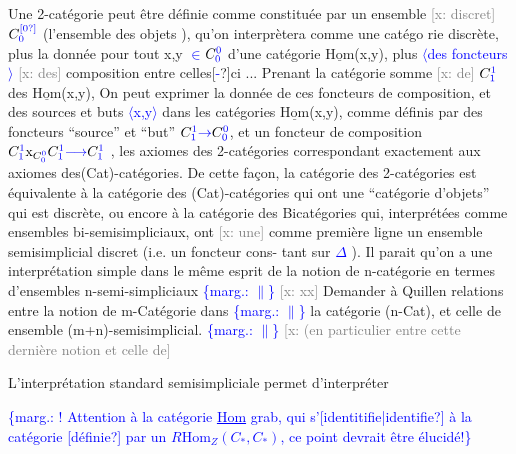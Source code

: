 \documentclass[11pt]{article}
\newcommand{\scanpage}[1]{\par\bigskip\noindent{\small\sffamily[scan #1]}\par}
\newcommand{\mspage}[1]{{\small\sffamily[p.\,#1]}}
\newcommand{\hand}[1]{\textcolor{blue}{#1}}
\newcommand{\inserted}[2][]{\textcolor{blue}{$\langle$#2$\rangle$}}
\newcommand{\margin}[1]{\textcolor{blue}{\{\textsf{marg.:} #1\}}}
\newcommand{\xout}[1]{\textcolor{gray}{[\textsf{x:} #1]}}
\newcommand{\uline}[1]{\underline{#1}}
\newcommand{\unsure}[1]{[#1?]}
\begin{document}
Une 2-catégorie peut être définie comme constituée par un ensemble
\xout{discret} $C^{\hand{\unsure{0}}}_{\hand{0}}$ (l'ensemble des objets ), qu'on interprètera comme une catégo
rie discrète, plus la donnée pour tout x,y \hand{$\in$}$C^{\hand{0}}_{\hand{0}}$ d'une catégorie $\underline{\mathrm{Hom}}$(x,y),
plus \inserted[typed]{des foncteurs} \xout{des} composition entre celles\unsure{\hand{-}}ci ... Prenant la catégorie somme \xout{de} $C^{\hand{1}}_{\hand{1}}$
des $\underline{\mathrm{Hom}}$(x,y), On peut exprimer la donnée de ces foncteurs de composition,
et des sources et buts \inserted[typed]{x,y} dans les catégories $\underline{\mathrm{Hom}}$(x,y), comme définis par
des foncteurs ``source'' et ``but'' $C^{\hand{1}}_{\hand{1}} \hand{\to} C^{\hand{0}}_{\hand{0}}$, et un foncteur de composition
$C^{\hand{1}}_{\hand{1}} \mathrm{x}_{C^{\hand{0}}_{\hand{0}}} C^{\hand{1}}_{\hand{1}} \hand{\longrightarrow} C^{\hand{1}}_{\hand{1}}$ , les axiomes des 2-catégories correspondant exactement aux
axiomes des(Cat)-catégories. De cette façon, la catégorie des 2-catégories
est équivalente à la catégorie des (Cat)-catégories qui ont une ``catégorie
d'objets'' qui est discrète, ou encore à la catégorie des Bicatégories
qui, interprétées comme ensembles bi-semisimpliciaux, ont \xout{une} comme
première ligne un ensemble semisimplicial discret (i.e. un foncteur cons-%
tant sur \hand{$\Delta$} ). Il parait qu'on a une interprétation simple dans le même
esprit de la notion de n-catégorie en termes d'ensembles n-semi-simpliciaux
\margin{$\|$} \xout{xx} Demander à Quillen relations entre la notion de m-Catégorie dans
\margin{$\|$} la catégorie (n-Cat), et celle de ensemble (m+n)-semisimplicial.
\margin{$\|$} \xout{(en particulier entre cette dernière notion et celle de}

L'interprétation standard semisimpliciale permet d'interpréter

\mspage{\hand{37}}

\clearpage
\scanpage{162-5/38}
\margin{! Attention à la catégorie \uline{Hom} grab, qui s'\unsure{identitifie|identifie} à la catégorie \unsure{définie} par un $R\mathrm{Hom}_{Z}(C_{*},C_{*})$, ce point devrait être élucidé!}
\end{document}

